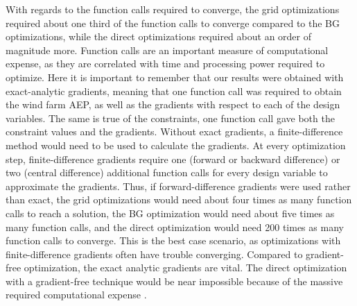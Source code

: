 \documentclass[wes, manuscript]{copernicus}
\begin{document}
With regards to the function calls required to converge, the grid optimizations required about one third of the function calls to converge compared to the BG optimizations, while the direct optimizations required about an order of magnitude more. Function calls are an important measure of computational expense, as they are correlated with time and processing power required to optimize. Here it is important to remember that our results were obtained with exact-analytic gradients, meaning that one function call was required to obtain the wind farm AEP, as well as the gradients with respect to each of the design variables. The same is true of the constraints, one function call gave both the constraint values and the gradients. Without exact gradients, a finite-difference method would need to be used to calculate the gradients. At every optimization step, finite-difference gradients require one (forward or backward difference) or two (central difference) additional function calls for every design variable to approximate the gradients. Thus, if forward-difference gradients were used rather than exact, the grid optimizations would need about four times as many function calls to reach a solution, the BG optimization would need about five times as many function calls, and the direct optimization would need 200 times as many function calls to converge. This is the best case scenario, as optimizations with finite-difference gradients often have trouble converging. Compared to gradient-free optimization, the exact analytic gradients are vital. The direct optimization with a gradient-free technique would be near impossible because of the massive required computational expense \citep{Ning2016a,Thomas2018}.
\end{document}
